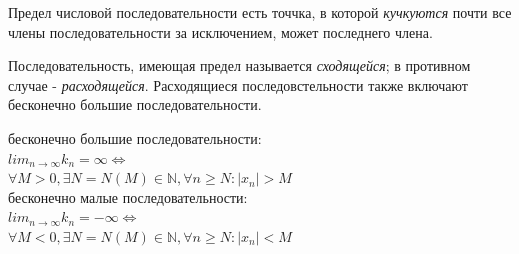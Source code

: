 \documentclass[oneside]{book}
\begin{document}
\begin{enumerate}
Предел числовой последовательности есть точчка, в которой \textit{кучкуются} почти все члены последовательности
за исключением, может последнего члена.

Последовательность, имеющая предел называется \textit{сходящейся}; в противном случае - \textit{расходящейся}.
Расходящиеся последовстельности также включают бесконечно большие последовательности.
\begin{center}
    бесконечно большие последовательности:\\
    $lim_{n \rightarrow \infty}{k_n} = \infty \Leftrightarrow$ \\
    $\forall M > 0, \exists N=N(M) \in \mathbb{N}, \forall n \geq N: |x_n| > M$ \\
    бесконечно малые последовательности:\\
    $lim_{n \rightarrow \infty}{k_n} = -\infty \Leftrightarrow$\\
    $\forall M < 0, \exists N=N(M) \in \mathbb{N}, \forall n \geq N: |x_n| < M$ \\
\end{center}


\end{enumerate}
\end{document}
